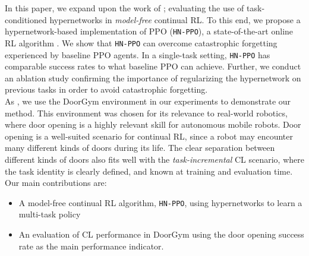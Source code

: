 \documentclass[dvipsnames]{article} %
\newcommand{\comment}[1]{}
\newcommand{\sa}[1] {\comment{{\color{cyan} SA: #1}}}                %
\newcommand{\jh}[1] {\comment{{\color{RawSienna} JH: #1}}}           %
\newcommand{\as}[1] {\comment{{\color{orange} AS: #1}}}              %
\begin{document}
In this paper, we expand upon the work of \citet{MBRLHypernetworks}; evaluating the use of task-conditioned hypernetworks in \textit{model-free} continual RL. To this end, we propose a hypernetwork-based implementation of PPO (\texttt{HN-PPO}), a state-of-the-art online RL algorithm \as{I would remove the "simple-to-implement", do not see the relevance}. We show that \texttt{HN-PPO} can overcome catastrophic forgetting experienced by baseline PPO agents. In a single-task setting, \texttt{HN-PPO} has comparable success rates to what baseline PPO can achieve. Further, we conduct an ablation study confirming the importance of regularizing the hypernetwork on previous tasks in order to avoid catastrophic forgetting.\\
As \citet{MBRLHypernetworks}, we use the DoorGym environment \citep{doorgym} in our experiments to demonstrate our method. This environment was chosen for its relevance to real-world robotics, where door opening is a highly relevant skill for autonomous mobile robots. Door opening is a well-suited scenario for continual RL, since a robot may encounter many different kinds of doors during its life. The clear separation between different kinds of doors also fits well with the \textit{task-incremental} \cite{threescenarios} CL scenario, where the task identity is clearly defined, and known at training and evaluation time. Our main contributions are:
\begin{itemize}
    \item A model-free continual RL algorithm, \texttt{HN-PPO}, using hypernetworks to learn a multi-task policy
    \item An evaluation of CL performance in DoorGym using the door opening success rate as the main performance indicator.
\end{itemize} 


\end{document}
